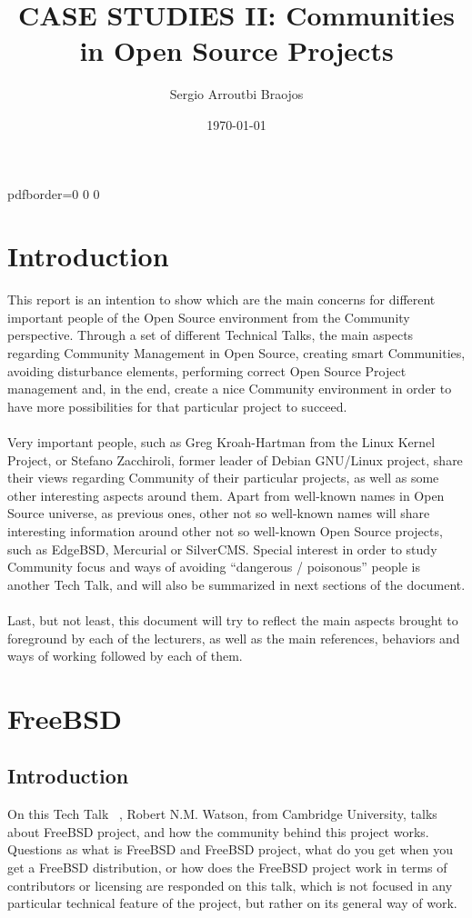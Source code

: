 \documentclass[11pt]{article}
\title{\textbf{CASE STUDIES II: Communities in Open Source Projects}}
\author{Sergio Arroutbi Braojos}
\date{\today}
\begin{document}
\hypersetup
{   
pdfborder={0 0 0}
}

\maketitle
\pagebreak

\tableofcontents
\pagebreak


\section{Introduction}
\label{sec:Introduction}
This report is an intention to show which are the main concerns for different important people of the Open Source environment from the Community perspective. Through a set of different Technical Talks, the main aspects regarding Community Management in Open Source, creating smart Communities, avoiding disturbance elements, performing correct Open Source Project management and, in the end, create a nice Community environment in order to have more possibilities for that particular project to succeed.\\
\\
Very important people, such as Greg Kroah-Hartman from the Linux Kernel Project, or Stefano Zacchiroli, former leader of Debian GNU/Linux project, share their views regarding Community of their particular projects, as well as some other interesting aspects around them. Apart from well-known names in Open Source universe, as previous ones, other not so well-known names will share interesting information around other not so well-known Open Source projects, such as EdgeBSD, Mercurial or SilverCMS. Special interest in order to study Community focus and ways of avoiding ``dangerous / poisonous'' people is another Tech Talk, and will also be summarized in next sections of the document.\\
\\
Last, but not least, this document will try to reflect the main aspects brought to foreground by each of the lecturers, as well as the main references, behaviors and ways of working followed by each of them.

\pagebreak

\section{FreeBSD}
\label{sec:FreeBSD}
\subsection{Introduction}
On this Tech Talk ~\cite{TALK00}, Robert N.M. Watson, from Cambridge University, talks about FreeBSD project, and how the community behind this project works. Questions as what is FreeBSD and FreeBSD project, what do you get when you get a FreeBSD distribution, or how does the FreeBSD project work in terms of contributors or licensing are responded on this talk, which is not focused in any particular technical feature of the project, but rather on its general way of work.
\end{document}
